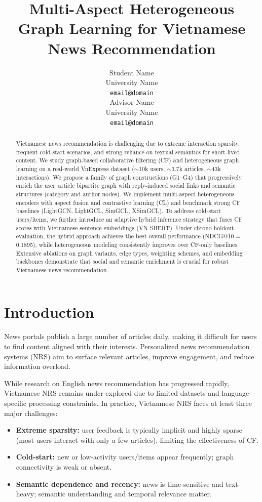 \documentclass[11pt]{article}
\title{Multi-Aspect Heterogeneous Graph Learning for Vietnamese News Recommendation}
\author{
  Student Name \\
  University Name \\
  \texttt{email@domain} \\
  \And
  Advisor Name \\
  University Name \\
  \texttt{email@domain}
}
\begin{document}
\maketitle

\begin{abstract}
Vietnamese news recommendation is challenging due to extreme interaction sparsity, frequent cold-start scenarios, and strong reliance on textual semantics for short-lived content. We study graph-based collaborative filtering (CF) and heterogeneous graph learning on a real-world VnExpress dataset (\(\sim\)10k users, \(\sim\)3.7k articles, \(\sim\)43k interactions). We propose a family of graph constructions (G1--G4) that progressively enrich the user--article bipartite graph with reply-induced social links and semantic structures (category and author nodes). We implement multi-aspect heterogeneous encoders with aspect fusion and contrastive learning (CL) and benchmark strong CF baselines (LightGCN, LightGCL, SimGCL, XSimGCL). To address cold-start users/items, we further introduce an adaptive hybrid inference strategy that fuses CF scores with Vietnamese sentence embeddings (VN-SBERT). Under chrono-holdout evaluation, the hybrid approach achieves the best overall performance (NDCG@10 = 0.1895), while heterogeneous modeling consistently improves over CF-only baselines. Extensive ablations on graph variants, edge types, weighting schemes, and embedding backbones demonstrate that social and semantic enrichment is crucial for robust Vietnamese news recommendation.
\end{abstract}

\section{Introduction}
News portals publish a large number of articles daily, making it difficult for users to find content aligned with their interests. Personalized news recommendation systems (NRS) aim to surface relevant articles, improve engagement, and reduce information overload.

While research on English news recommendation has progressed rapidly, Vietnamese NRS remains under-explored due to limited datasets and language-specific processing constraints. In practice, Vietnamese NRS faces at least three major challenges:
\begin{itemize}[leftmargin=*]
  \item \textbf{Extreme sparsity:} user feedback is typically implicit and highly sparse (most users interact with only a few articles), limiting the effectiveness of CF.
  \item \textbf{Cold-start:} new or low-activity users/items appear frequently; graph connectivity is weak or absent.
  \item \textbf{Semantic dependence and recency:} news is time-sensitive and text-heavy; semantic understanding and temporal relevance matter.
\end{itemize}
\end{document}
